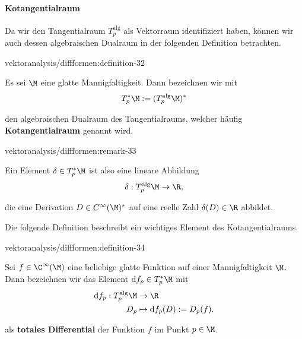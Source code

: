\documentclass[letterpaper,10pt,english]{jupyterBook}
\begin{document}
\paragraph{Kotangentialraum}
\label{\detokenize{vektoranalysis/diffformen:kotangentialraum}}
\par
Da wir den Tangentialraum \(T^{\text{alg}}_p\) als Vektorraum identifiziert haben, können wir auch dessen algebraischen Dualraum in der folgenden Definition betrachten.
\begin{definition}{}{vektoranalysis/diffformen:definition-32}



\par
Es sei \(\M\) eine glatte Mannigfaltigkeit.
Dann bezeichnen wir mit
\begin{align*}
T_p^\ast\M:= (T_p^{\text{alg}}\M)^\ast
\end{align*}
\par
den algebraischen Dualraum des Tangentialraums, welcher häufig \textbf{Kotangentialraum} genannt wird.
\end{definition}
\begin{remark}{}{vektoranalysis/diffformen:remark-33}



\par
Ein Element \(\delta\in T_p^\ast\M\) ist also eine lineare Abbildung
\begin{align*}
\delta: T_p^{\text{alg}}\M \to \R,
\end{align*}
\par
die eine Derivation \(D\in C^\infty(\M)^\ast\) auf eine reelle Zahl \(\delta(D)\in\R\) abbildet.
\end{remark}

\par
Die folgende Definition beschreibt ein wichtiges Element des Kotangentialraums.
\begin{definition}{}{vektoranalysis/diffformen:definition-34}



\par
Sei \(f\in\C^\infty(\M)\) eine beliebige glatte Funktion auf einer Mannigfaltigkeit \(\M\).
Dann bezeichnen wir das Element \(\mathrm{d}f_p \in T_p^\ast\M\) mit
\begin{align*}
\mathrm{d}f_p: T_p^{\text{alg}}\M &\to\R\\
D_p &\mapsto \mathrm{d}f_p(D):= D_p(f).
\end{align*}
\par
als \textbf{totales Differential} der Funktion \(f\) im Punkt \(p \in \M\).
\end{definition}
\end{document}
